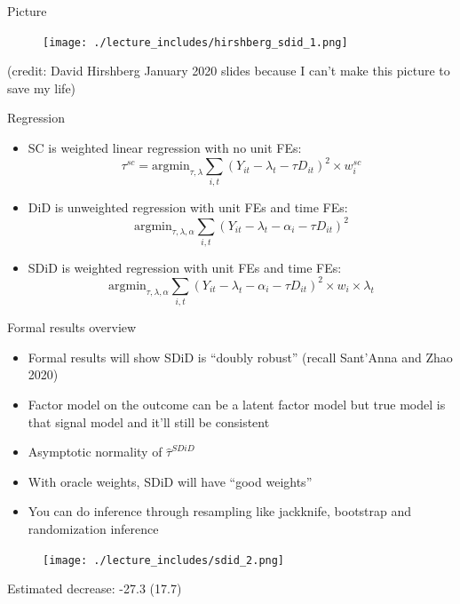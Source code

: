 \documentclass{beamer}
\begin{document}
\begin{frame}{Picture}

	\begin{figure}
	\texttt{[image: ./lecture\_includes/hirshberg\_sdid\_1.png]}
	\end{figure}

(credit: David Hirshberg January 2020 slides because I can't make this picture to save my life)

\end{frame}

\begin{frame}{Regression}

\begin{itemize}
\item SC is weighted linear regression with no unit FEs:$$\tau^{sc} = \textrm{argmin}_{\tau, \lambda}  \sum_{i,t} (Y_{it} - \lambda_t - \tau D_{it})^2 \times w_i^{sc} $$
\item DiD is unweighted regression with unit FEs and time FEs:$$\textrm{argmin}_{\tau, \lambda, \alpha}  \sum_{i,t} (Y_{it} - \lambda_t - \alpha_i -  \tau D_{it})^2 $$
\item SDiD is weighted regression with unit FEs and time FEs:$$ \textrm{argmin}_{\tau, \lambda, \alpha} \sum_{i,t} (Y_{it} - \lambda_t - \alpha_i - \tau D_{it})^2 \times w_i \times \lambda_t$$
\end{itemize}

\end{frame}

\begin{frame}{Formal results overview}

\begin{itemize}
\item Formal results will show SDiD is ``doubly robust'' (recall Sant'Anna and Zhao 2020)
\item Factor model  on the outcome can be a latent factor model but true model is that signal model and it'll still be consistent
\item Asymptotic normality of $\widehat{\tau}^{SDiD}$
\item With oracle weights, SDiD will have ``good weights''
\item You can do inference through resampling like jackknife, bootstrap and randomization inference
\end{itemize}

\end{frame}


\begin{frame}[plain]

	\begin{figure}
	\texttt{[image: ./lecture\_includes/sdid\_2.png]}
	\end{figure}
	
Estimated decrease: -27.3 (17.7)

\end{frame}
\end{document}
